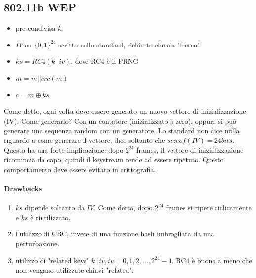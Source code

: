 \documentclass[a4paper,12pt]{article}
\begin{document}
\subsection{802.11b WEP}
\begin{itemize}
	\item pre-condivisa $k$
	\item $IV$ su $\{0,1\}^{24}$ scritto nello standard, richiesto che sia "fresco"
	\item $ks = RC4(k||iv)$, dove RC4 è il PRNG
	\item $m = m||crc(m)$
	\item $c = m \oplus ks$
\end{itemize}
Come detto, ogni volta deve essere generato un nuovo vettore di inizializzazione (IV).
Come generarlo? Con un contatore (inizializzato a zero), oppure si può generare una sequenza random con un generatore. 
Lo standard non dice nulla riguardo a come generare il vettore, dice soltanto che $sizeof(IV) = 24 bits$. 
Questo ha una forte implicazione: dopo $2^24$ frames, il vettore di inizializzazione ricomincia da capo, quindi il keystream tende ad essere ripetuto. 
Questo comportamento deve essere evitato in crittografia.
\paragraph{Drawbacks}
\begin{enumerate}[label=\alph*.]
	\item $ks$ dipende soltanto da $IV$. Come detto, dopo $2^{24}$ frames si ripete ciclicamente e $ks$ è riutilizzato.
	\item l'utilizzo di CRC, invece di una funzione hash imbrogliata da una perturbazione.
	\item utilizzo di "related keys" $k||iv, iv = 0, 1, 2, ..., 2^{24}-1$. RC4 è buono a meno che non vengano utilizzate chiavi "related".
\end{enumerate}
\end{document}

